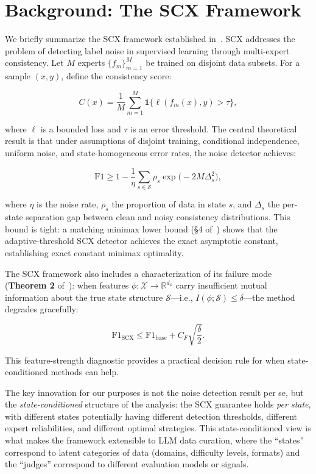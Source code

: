 \documentclass[11pt,twocolumn]{article}
\newcommand{\R}{\mathbb{R}}
\begin{document}
\section{Background: The SCX Framework}

We briefly summarize the SCX framework established in~\cite{scx2026}. SCX addresses the problem of detecting label noise in supervised learning through multi-expert consistency. Let $M$ experts $\{f_m\}_{m=1}^M$ be trained on disjoint data subsets. For a sample $(x, y)$, define the consistency score:

\begin{equation}
C(x) = \frac{1}{M} \sum_{m=1}^M \mathbf{1}\{\ell(f_m(x), y) > \tau\},
\end{equation}

where $\ell$ is a bounded loss and $\tau$ is an error threshold. The central theoretical result is that under assumptions of disjoint training, conditional independence, uniform noise, and state-homogeneous error rates, the noise detector achieves:

\begin{equation}
\mathrm{F1} \geq 1 - \frac{1}{\eta} \sum_{s \in \mathcal{S}} \rho_s \exp\!\bigl(-2M\Delta_s^2\bigr),
\label{eq:scx_f1_bound}
\end{equation}

where $\eta$ is the noise rate, $\rho_s$ the proportion of data in state $s$, and $\Delta_s$ the per-state separation gap between clean and noisy consistency distributions. This bound is tight: a matching minimax lower bound (\S4 of~\cite{scx2026}) shows that the adaptive-threshold SCX detector achieves the exact asymptotic constant, establishing exact constant minimax optimality.

The SCX framework also includes a characterization of its failure mode (\textbf{Theorem 2} of~\cite{scx2026}): when features $\phi: \mathcal{X} \to \R^{d_\phi}$ carry insufficient mutual information about the true state structure $\mathcal{S}$---i.e., $I(\phi; \mathcal{S}) \leq \delta$---the method degrades gracefully:

\begin{equation}
\mathrm{F1}_{\mathrm{SCX}} \leq \mathrm{F1}_{\mathrm{base}} + C_F \sqrt{\frac{\delta}{2}}.
\label{eq:scx_weak_feature}
\end{equation}

This feature-strength diagnostic provides a practical decision rule for when state-conditioned methods can help.

The key innovation for our purposes is not the noise detection result per se, but the \textit{state-conditioned} structure of the analysis: the SCX guarantee holds \textit{per state}, with different states potentially having different detection thresholds, different expert reliabilities, and different optimal strategies. This state-conditioned view is what makes the framework extensible to LLM data curation, where the ``states'' correspond to latent categories of data (domains, difficulty levels, formats) and the ``judges'' correspond to different evaluation models or signals.
\end{document}
